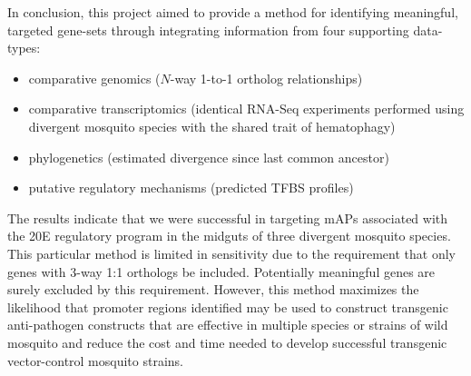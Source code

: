 In conclusion, this project aimed to provide a method for identifying meaningful, targeted gene-sets through integrating information from four supporting data-types:

\begin{itemize}
    \item comparative genomics ($N$-way 1-to-1 ortholog relationships)
    \item comparative transcriptomics (identical \gls{RNA-Seq} experiments performed using divergent mosquito species with the shared trait of \gls{hematophagy})
    \item phylogenetics (estimated divergence since last common ancestor)
    \item putative regulatory mechanisms (predicted \gls{TFBS} profiles)
\end{itemize}

The results indicate that we were successful in targeting \glspl{mAP} associated with the \gls{20E} regulatory program in the midguts of three divergent mosquito species.
%
This particular method is limited in sensitivity due to the requirement that only genes with 3-way 1:1 orthologs be included.
%
Potentially meaningful genes are surely excluded by this requirement.
%
However, this method maximizes the likelihood that promoter regions identified may be used to construct transgenic anti-pathogen constructs that are effective in multiple species or strains of wild mosquito and reduce the cost and time needed to develop successful transgenic vector-control mosquito strains.




